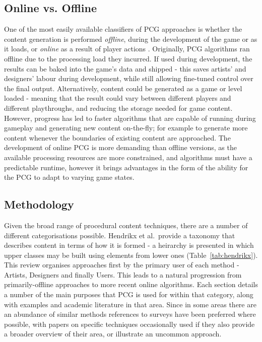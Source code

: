 \documentclass{acm_proc_article-sp}
\begin{document}
\subsection{Online vs. Offline}
One of the most easily available classifiers of PCG approaches is whether the content generation is performed \textit{offline}, during the development of the game or as it loads, or \textit{online} as a result of player actions \cite{togelius2011search}. Originally, PCG algorithms ran offline due to the processing load they incurred. If used during development, the results can be baked into the game's data and shipped - this saves artists' and designers' labour during development, while still allowing fine-tuned control over the final output. Alternatively, content could be generated as a game or level loaded - meaning that the result could vary between different players and different playthroughs, and reducing the storage needed for game content. However, progress has led to faster algorithms that are capable of running during gameplay and generating new content on-the-fly; for example to generate more content whenever the boundaries of existing content are approached. The development of online PCG is more demanding than offline versions, as the available processing resources are more constrained, and algorithms must have a predictable runtime, however it brings advantages in the form of the ability for the PCG to adapt to varying game states.

\subsection{Methodology}
Given the broad range of procedural content techniques, there are a number of different categorisations possible. Hendrikx et al.\ provide a taxonomy that describes content in terms of how it is formed - a heirarchy is presented in which upper classes may be built using elements from lower ones (Table~\ref{tab:hendrikx}).
This review organises approaches first by the primary user of each method - Artists, Designers and finally Users. This leads to a natural progression from primarily-offline approaches to more recent online algorithms. Each section details a number of the main purposes that PCG is used for within that category, along with examples and academic literature in that area. Since in some areas there are an abundance of similar methods references to surveys have been preferred where possible, with papers on specific techniques occasionally used if they also provide a broader overview of their area, or illustrate an uncommon approach.
\end{document}
